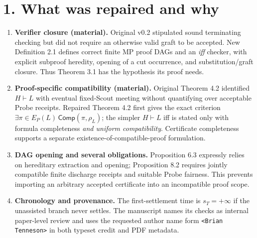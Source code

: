 \documentclass[11pt,letterpaper]{article}
\begin{document}
\section*{1. What was repaired and why}
\begin{enumerate}[leftmargin=*,itemsep=3pt]
\item \textbf{Verifier closure (material).} Original v0.2 stipulated sound terminating checking but did not require an otherwise valid graft to be accepted. New Definition 2.1 defines correct finite MP proof DAGs and an \emph{iff} checker, with explicit subproof heredity, opening of a cut occurrence, and substitution/graft closure. Thus Theorem 3.1 has the hypothesis its proof needs.
\item \textbf{Proof-specific compatibility (material).} Original Theorem 4.2 identified $H\vdash L$ with eventual fixed-Scout meeting without quantifying over acceptable Probe receipts. Repaired Theorem 4.2 first gives the exact criterion $\exists\pi\in E_P(L)\,\mathsf{Comp}(\pi,\rho_L)$; the simpler $H\vdash L$ iff is stated only with formula completeness \emph{and uniform compatibility}. Certificate completeness supports a separate existence-of-compatible-proof formulation.
\item \textbf{DAG opening and several obligations.} Proposition 6.3 expressly relies on hereditary extraction and opening; Proposition 8.2 requires jointly compatible finite discharge receipts and suitable Probe fairness. This prevents importing an arbitrary accepted certificate into an incompatible proof scope.
\item \textbf{Chronology and provenance.} The first-settlement time is $s_T=+\infty$ if the unassisted branch never settles. The manuscript names its checks as internal paper-level review and uses the requested author name form \texttt{<Brian Tenneson>} in both typeset credit and PDF metadata.
\end{enumerate}
\end{document}
